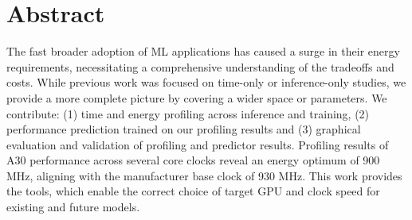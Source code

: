 \begingroup
\let\clearpage\relax
\let\cleardoublepage\relax
\let\cleardoublepage\relax


\chapter*{Abstract}








The fast broader adoption of ML applications has caused a surge in their energy requirements, necessitating a comprehensive understanding of the tradeoffs and costs. While previous work was focused on time-only or inference-only studies, we provide a more complete picture by covering a wider space or parameters. We contribute: (1) time and energy profiling across inference and training, (2) performance prediction trained on our profiling results and (3) graphical evaluation and validation of profiling and predictor results. Profiling results of A30 performance across several core clocks reveal an energy optimum of 900 MHz, aligning with the manufacturer base clock of 930 MHz. This work provides the tools, which enable the correct choice of target GPU and clock speed for existing and future models.



